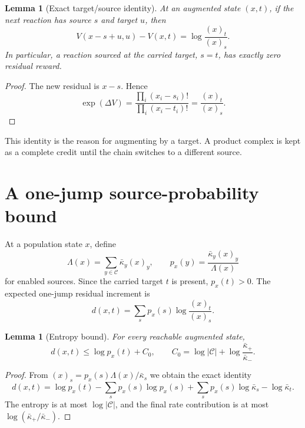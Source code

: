 \documentclass[11pt]{article}
\newtheorem{lemma}[theorem]{Lemma}
\theoremstyle{definition}
\newcommand{\Ccal}{\mathcal C}
\newcommand{\ff}[2]{(#1)_{#2}}
\begin{document}
\begin{lemma}[Exact target/source identity]\label{lem:residual}
At an augmented state \((x,t)\), if the next reaction has source \(s\) and
target \(u\), then
\begin{equation}\label{eq:residual-increment}
  V(x-s+u,u)-V(x,t)
  =\log\frac{\ff{x}{t}}{\ff{x}{s}}.
\end{equation}
In particular, a reaction sourced at the carried target, \(s=t\), has exactly
zero residual reward.
\end{lemma}

\begin{proof}
The new residual is \(x-s\).  Hence
\[
 \exp(\Delta V)
 =\frac{\prod_i(x_i-s_i)!}{\prod_i(x_i-t_i)!}
 =\frac{\ff{x}{t}}{\ff{x}{s}}.
\]
\end{proof}

This identity is the reason for augmenting by a target.  A product complex is
kept as a complete credit until the chain switches to a different source.

\section{A one-jump source-probability bound}

At a population state \(x\), define
\[
  \Lambda(x)=\sum_{y\in\Ccal}\bar\kappa_y\ff{x}{y},
  \qquad
  p_x(y)=\frac{\bar\kappa_y\ff{x}{y}}{\Lambda(x)}
\]
for enabled sources.  Since the carried target \(t\) is present,
\(p_x(t)>0\).  The expected one-jump residual increment is
\[
  d(x,t)=\sum_s p_x(s)\log\frac{\ff{x}{t}}{\ff{x}{s}}.
\]

\begin{lemma}[Entropy bound]\label{lem:entropy}
For every reachable augmented state,
\begin{equation}\label{eq:entropy-bound}
  d(x,t)\leq \log p_x(t)+C_0,
  \qquad
  C_0=\log|\Ccal|+
       \log\frac{\bar\kappa_+}{\bar\kappa_-}.
\end{equation}
\end{lemma}

\begin{proof}
From
\(
\ff{x}{s}=p_x(s)\Lambda(x)/\bar\kappa_s
\)
we obtain the exact identity
\[
 d(x,t)
 =\log p_x(t)-\sum_s p_x(s)\log p_x(s)
   +\sum_s p_x(s)\log\bar\kappa_s-
    \log\bar\kappa_t.
\]
The entropy is at most \(\log|\Ccal|\), and the final rate contribution is at
most \(\log(\bar\kappa_+/\bar\kappa_-)\).
\end{proof}
\end{document}
